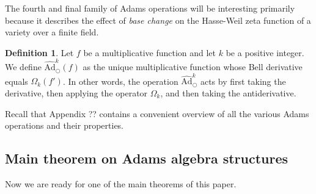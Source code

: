 \documentclass[a4paper]{article}
\theoremstyle{definition}
\newtheorem{definition}{Definition}[section]
\theoremstyle{remark}
\newtheorem*{remark}{Remark}
\newcommand{\hatadam}[1]{\widehat{\text{Ad}}^{#1}_{\bigcirc}}
\begin{document}
The fourth and final family of Adams operations will be interesting primarily because it describes the effect of \emph{base change} on the Hasse-Weil zeta function of a variety over a finite field.

\begin{definition}
Let $f$ be a multiplicative function and let $k$ be a positive integer. We define $\hatadam{k}(f)$ as the unique multiplicative function whose Bell derivative equals $\Omega_k(f')$. In other words, the operation $\hatadam{k}$ acts by first taking the derivative, then applying the operator $\Omega_k$, and then taking the antiderivative.

\end{definition}

Recall that Appendix ?? contains a convenient overview of all the various Adams operations and their properties.


\subsection{Main theorem on Adams algebra structures}

Now we are ready for one of the main theorems of this paper.
\end{document}

